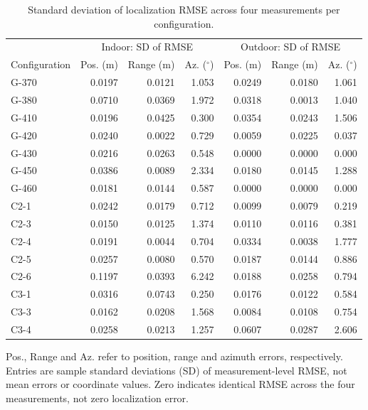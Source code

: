 \begin{table}[t]
\centering
\caption{Standard deviation of localization RMSE across four measurements per configuration.}
\label{tab:stability}
\footnotesize
\setlength{\tabcolsep}{1.5pt}
\begin{tabular}{lrrrrrr}
\hline
 & \multicolumn{3}{c}{Indoor: SD of RMSE} & \multicolumn{3}{c}{Outdoor: SD of RMSE} \\ Configuration & Pos. (m) & Range (m) & Az. ($^\circ$) & Pos. (m) & Range (m) & Az. ($^\circ$) \\
\hline
G-370 & 0.0197 & 0.0121 & 1.053 & 0.0249 & 0.0180 & 1.061 \\
G-380 & 0.0710 & 0.0369 & 1.972 & 0.0318 & 0.0013 & 1.040 \\
G-410 & 0.0196 & 0.0425 & 0.300 & 0.0354 & 0.0243 & 1.506 \\
G-420 & 0.0240 & 0.0022 & 0.729 & 0.0059 & 0.0225 & 0.037 \\
G-430 & 0.0216 & 0.0263 & 0.548 & 0.0000 & 0.0000 & 0.000 \\
G-450 & 0.0386 & 0.0089 & 2.334 & 0.0180 & 0.0145 & 1.288 \\
G-460 & 0.0181 & 0.0144 & 0.587 & 0.0000 & 0.0000 & 0.000 \\
C2-1 & 0.0242 & 0.0179 & 0.712 & 0.0099 & 0.0079 & 0.219 \\
C2-3 & 0.0150 & 0.0125 & 1.374 & 0.0110 & 0.0116 & 0.381 \\
C2-4 & 0.0191 & 0.0044 & 0.704 & 0.0334 & 0.0038 & 1.777 \\
C2-5 & 0.0257 & 0.0080 & 0.570 & 0.0187 & 0.0144 & 0.886 \\
C2-6 & 0.1197 & 0.0393 & 6.242 & 0.0188 & 0.0258 & 0.794 \\
C3-1 & 0.0316 & 0.0743 & 0.250 & 0.0176 & 0.0122 & 0.584 \\
C3-3 & 0.0162 & 0.0208 & 1.568 & 0.0084 & 0.0108 & 0.754 \\
C3-4 & 0.0258 & 0.0213 & 1.257 & 0.0607 & 0.0287 & 2.606 \\
\hline
\end{tabular}
\par\smallskip\parbox{0.98\linewidth}{\scriptsize Pos., Range and Az. refer to position, range and azimuth errors, respectively. Entries are sample standard deviations (SD) of measurement-level RMSE, not mean errors or coordinate values. Zero indicates identical RMSE across the four measurements, not zero localization error.}
\end{table}
